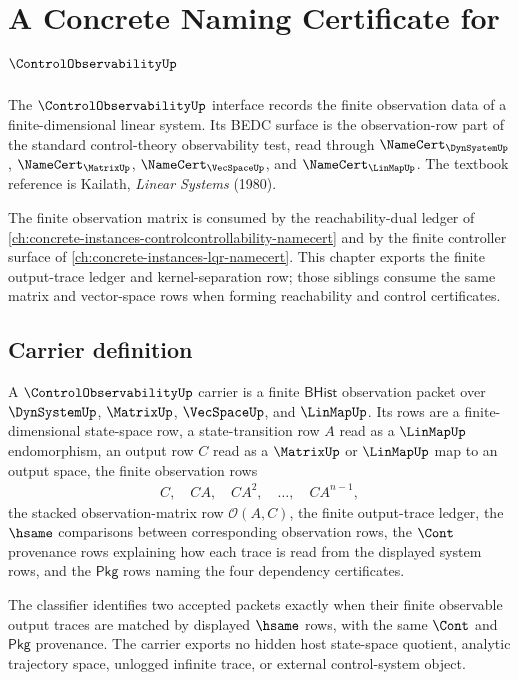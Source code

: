 \chapter{A Concrete Naming Certificate for $\ControlObservabilityUp$}
\label{ch:concrete-instances-controlobservability-namecert}

The $\ControlObservabilityUp$ interface records the finite observation data of a finite-dimensional linear system. Its BEDC surface is the observation-row part of the standard control-theory observability test, read through $\NameCert_{\DynSystemUp}$, $\NameCert_{\MatrixUp}$, $\NameCert_{\VecSpaceUp}$, and $\NameCert_{\LinMapUp}$. The textbook reference is Kailath, \emph{Linear Systems} (1980).

The finite observation matrix is consumed by the reachability-dual ledger of \autoref{ch:concrete-instances-controlcontrollability-namecert} and by the finite controller surface of \autoref{ch:concrete-instances-lqr-namecert}. This chapter exports the finite output-trace ledger and kernel-separation row; those siblings consume the same matrix and vector-space rows when forming reachability and control certificates.

\section{Carrier definition}
\label{sec:control-observability-carrier}

\begin{definition}
\label{def:control-observability-carrier}
A $\ControlObservabilityUp$ carrier is a finite $\mathsf{BHist}$ observation packet over $\DynSystemUp$, $\MatrixUp$, $\VecSpaceUp$, and $\LinMapUp$. Its rows are a finite-dimensional state-space row, a state-transition row $A$ read as a $\LinMapUp$ endomorphism, an output row $C$ read as a $\MatrixUp$ or $\LinMapUp$ map to an output space, the finite observation rows
$$
\begin{aligned}
C,\quad CA,\quad CA^2,\quad \ldots,\quad CA^{n-1},
\end{aligned}
$$
the stacked observation-matrix row $\mathcal O(A,C)$, the finite output-trace ledger, the $\hsame$ comparisons between corresponding observation rows, the $\Cont$ provenance rows explaining how each trace is read from the displayed system rows, and the $\mathsf{Pkg}$ rows naming the four dependency certificates.

The classifier identifies two accepted packets exactly when their finite observable output traces are matched by displayed $\hsame$ rows, with the same $\Cont$ and $\mathsf{Pkg}$ provenance. The carrier exports no hidden host state-space quotient, analytic trajectory space, unlogged infinite trace, or external control-system object.
\end{definition}

